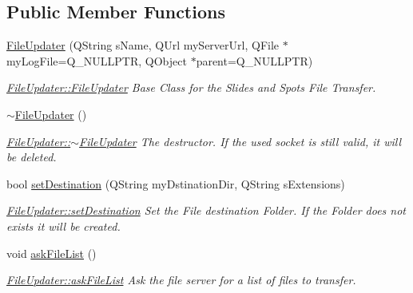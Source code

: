 \subsection*{Public Member Functions}
\begin{DoxyCompactItemize}
\item 
\mbox{\hyperlink{classFileUpdater_ae72e563d822b8daef58e2c2f515af3fc}{File\+Updater}} (Q\+String s\+Name, Q\+Url my\+Server\+Url, Q\+File $\ast$my\+Log\+File=Q\+\_\+\+N\+U\+L\+L\+P\+TR, Q\+Object $\ast$parent=Q\+\_\+\+N\+U\+L\+L\+P\+TR)
\begin{DoxyCompactList}\small\item\em \mbox{\hyperlink{classFileUpdater_ae72e563d822b8daef58e2c2f515af3fc}{File\+Updater\+::\+File\+Updater}} Base Class for the Slides and Spots File Transfer. \end{DoxyCompactList}\item 
\mbox{\label{classFileUpdater_a5759d843d1dcb702f1adbb97e61bb440}} 
\mbox{\hyperlink{classFileUpdater_a5759d843d1dcb702f1adbb97e61bb440}{$\sim$\+File\+Updater}} ()
\begin{DoxyCompactList}\small\item\em \mbox{\hyperlink{classFileUpdater_a5759d843d1dcb702f1adbb97e61bb440}{File\+Updater\+::$\sim$\+File\+Updater}} The destructor. If the used socket is still valid, it will be deleted. \end{DoxyCompactList}\item 
bool \mbox{\hyperlink{classFileUpdater_aad3c90fbc960c8aa84b964f3ae1d8f11}{set\+Destination}} (Q\+String my\+Dstination\+Dir, Q\+String s\+Extensions)
\begin{DoxyCompactList}\small\item\em \mbox{\hyperlink{classFileUpdater_aad3c90fbc960c8aa84b964f3ae1d8f11}{File\+Updater\+::set\+Destination}} Set the File destination Folder. If the Folder does not exists it will be created. \end{DoxyCompactList}\item 
\mbox{\label{classFileUpdater_a7935a0431987ac2bcdd0b602afc69203}} 
void \mbox{\hyperlink{classFileUpdater_a7935a0431987ac2bcdd0b602afc69203}{ask\+File\+List}} ()
\begin{DoxyCompactList}\small\item\em \mbox{\hyperlink{classFileUpdater_a7935a0431987ac2bcdd0b602afc69203}{File\+Updater\+::ask\+File\+List}} Ask the file server for a list of files to transfer. \end{DoxyCompactList}\end{DoxyCompactItemize}


